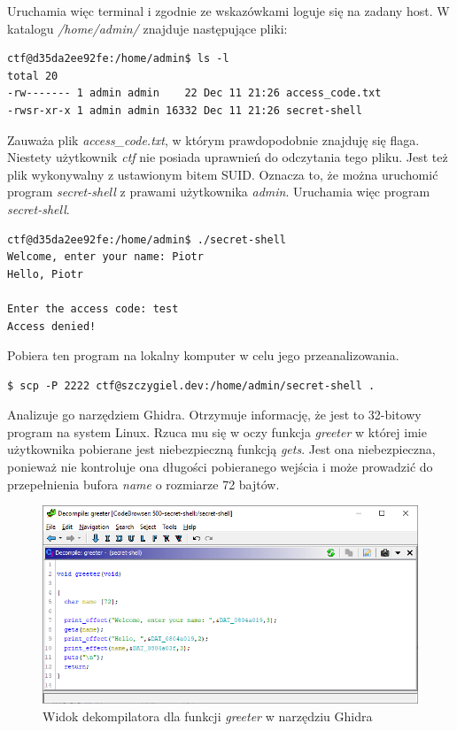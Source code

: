 \documentclass[language=polish,type=eng]{aghmodern}
\begin{document}
Uruchamia więc terminal i zgodnie ze wskazówkami loguje się na zadany host.
W katalogu \emph{/home/admin/} znajduje następujące pliki:

\begin{verbatim}
ctf@d35da2ee92fe:/home/admin$ ls -l
total 20
-rw------- 1 admin admin    22 Dec 11 21:26 access_code.txt
-rwsr-xr-x 1 admin admin 16332 Dec 11 21:26 secret-shell
\end{verbatim}

Zauważa plik \emph{access\_code.txt}, w którym prawdopodobnie znajduję się flaga.
Niestety użytkownik \emph{ctf} nie posiada uprawnień do odczytania tego pliku.
Jest też plik wykonywalny z ustawionym bitem SUID.
Oznacza to, że można uruchomić program \emph{secret-shell} z prawami użytkownika \emph{admin}.
Uruchamia więc program \emph{secret-shell}.

\begin{verbatim}
ctf@d35da2ee92fe:/home/admin$ ./secret-shell
Welcome, enter your name: Piotr
Hello, Piotr

Enter the access code: test
Access denied!
\end{verbatim}

Pobiera ten program na lokalny komputer w celu jego przeanalizowania.

\begin{verbatim}
$ scp -P 2222 ctf@szczygiel.dev:/home/admin/secret-shell .
\end{verbatim}

Analizuje go narzędziem Ghidra. Otrzymuje informację, że jest to 32-bitowy program
na system Linux. Rzuca mu się w oczy funkcja \emph{greeter} w której
imie użytkownika pobierane jest niebezpieczną funkcją \emph{gets}. Jest ona niebezpieczna,
ponieważ nie kontroluje ona długości pobieranego wejścia i może prowadzić do przepełnienia
bufora \emph{name} o rozmiarze 72 bajtów.

\begin{figure}[H]
\centering
\includegraphics[width=\textwidth]{500_greeter}
\caption{Widok dekompilatora dla funkcji \emph{greeter} w narzędziu Ghidra}
\end{figure}
\end{document}
